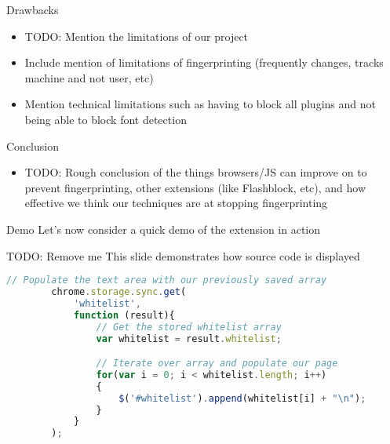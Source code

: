 \begin{frame}[fragile,t]{Drawbacks}
	\begin{itemize}
		\item TODO: Mention the limitations of our project
		\item Include mention of limitations of fingerprinting (frequently changes, tracks machine and not user, etc)
		\item Mention technical limitations such as having to block all plugins and not being able to block font detection
	\end{itemize}
\end{frame}

\begin{frame}[fragile,t]{Conclusion}
	\begin{itemize}
		\item TODO: Rough conclusion of the things browsers/JS can improve on to prevent fingerprinting, other extensions (like Flashblock, etc), and how effective we think our techniques are at stopping fingerprinting
	\end{itemize}
\end{frame}

\begin{frame}[plain]
	\begin{block}{Demo}
		Let's now consider a quick demo of the extension in action
	\end{block}
\end{frame}
\addtocounter{framenumber}{-1}

\begin{frame}[fragile,t]{TODO: Remove me}
	This slide demonstrates how source code is displayed
	\begin{lstlisting}[language=JavaScript]
		// Populate the text area with our previously saved array
		chrome.storage.sync.get(
		    'whitelist',
		    function (result){
		        // Get the stored whitelist array
		        var whitelist = result.whitelist;

		        // Iterate over array and populate our page
		        for(var i = 0; i < whitelist.length; i++)
		        {
		            $('#whitelist').append(whitelist[i] + "\n");
		        }
		    }
		);
	\end{lstlisting}
\end{frame}

